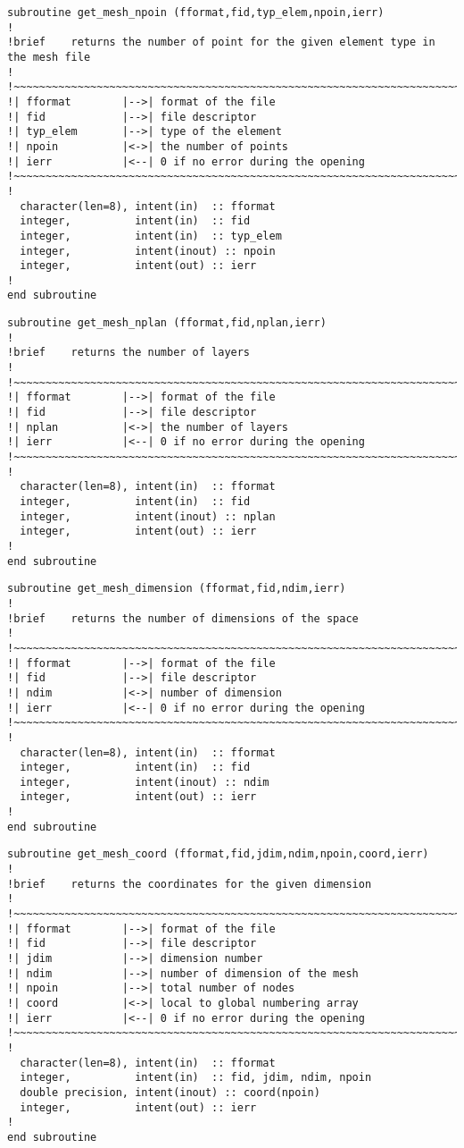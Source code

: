 %
\begin{lstlisting}
subroutine get_mesh_npoin (fformat,fid,typ_elem,npoin,ierr)
!
!brief    returns the number of point for the given element type in the mesh file
!
!~~~~~~~~~~~~~~~~~~~~~~~~~~~~~~~~~~~~~~~~~~~~~~~~~~~~~~~~~~~~~~~~~~~~~~~
!| fformat        |-->| format of the file
!| fid            |-->| file descriptor
!| typ_elem       |-->| type of the element
!| npoin          |<->| the number of points
!| ierr           |<--| 0 if no error during the opening
!~~~~~~~~~~~~~~~~~~~~~~~~~~~~~~~~~~~~~~~~~~~~~~~~~~~~~~~~~~~~~~~~~~~~~~~
!
  character(len=8), intent(in)  :: fformat
  integer,          intent(in)  :: fid
  integer,          intent(in)  :: typ_elem
  integer,          intent(inout) :: npoin
  integer,          intent(out) :: ierr
!
end subroutine
\end{lstlisting}
%
\begin{lstlisting}
subroutine get_mesh_nplan (fformat,fid,nplan,ierr)
!
!brief    returns the number of layers
!
!~~~~~~~~~~~~~~~~~~~~~~~~~~~~~~~~~~~~~~~~~~~~~~~~~~~~~~~~~~~~~~~~~~~~~~~
!| fformat        |-->| format of the file
!| fid            |-->| file descriptor
!| nplan          |<->| the number of layers
!| ierr           |<--| 0 if no error during the opening
!~~~~~~~~~~~~~~~~~~~~~~~~~~~~~~~~~~~~~~~~~~~~~~~~~~~~~~~~~~~~~~~~~~~~~~~
!
  character(len=8), intent(in)  :: fformat
  integer,          intent(in)  :: fid
  integer,          intent(inout) :: nplan
  integer,          intent(out) :: ierr
!
end subroutine
\end{lstlisting}
%
\begin{lstlisting}
subroutine get_mesh_dimension (fformat,fid,ndim,ierr)
!
!brief    returns the number of dimensions of the space
!
!~~~~~~~~~~~~~~~~~~~~~~~~~~~~~~~~~~~~~~~~~~~~~~~~~~~~~~~~~~~~~~~~~~~~~~~
!| fformat        |-->| format of the file
!| fid            |-->| file descriptor
!| ndim           |<->| number of dimension
!| ierr           |<--| 0 if no error during the opening
!~~~~~~~~~~~~~~~~~~~~~~~~~~~~~~~~~~~~~~~~~~~~~~~~~~~~~~~~~~~~~~~~~~~~~~~
!
  character(len=8), intent(in)  :: fformat
  integer,          intent(in)  :: fid
  integer,          intent(inout) :: ndim
  integer,          intent(out) :: ierr
!
end subroutine
\end{lstlisting}
%
\begin{lstlisting}
subroutine get_mesh_coord (fformat,fid,jdim,ndim,npoin,coord,ierr)
!
!brief    returns the coordinates for the given dimension
!
!~~~~~~~~~~~~~~~~~~~~~~~~~~~~~~~~~~~~~~~~~~~~~~~~~~~~~~~~~~~~~~~~~~~~~~~
!| fformat        |-->| format of the file
!| fid            |-->| file descriptor
!| jdim           |-->| dimension number
!| ndim           |-->| number of dimension of the mesh
!| npoin          |-->| total number of nodes
!| coord          |<->| local to global numbering array
!| ierr           |<--| 0 if no error during the opening
!~~~~~~~~~~~~~~~~~~~~~~~~~~~~~~~~~~~~~~~~~~~~~~~~~~~~~~~~~~~~~~~~~~~~~~~
!
  character(len=8), intent(in)  :: fformat
  integer,          intent(in)  :: fid, jdim, ndim, npoin
  double precision, intent(inout) :: coord(npoin)
  integer,          intent(out) :: ierr
!
end subroutine
\end{lstlisting}
